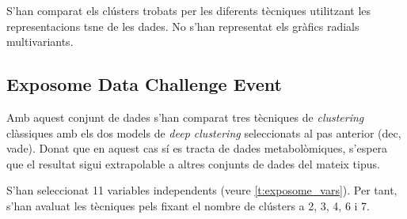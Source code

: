\documentclass[CAT,BIB]{TFUOC}%
\begin{document}
                S'han comparat els clústers trobats per les diferents tècniques
                utilitzant les representacions \gls{tsne} de les dades.
                No s'han representat els gràfics radials multivariants.


        \subsection{Exposome Data Challenge Event}
        \label{s:exposome}

            Amb aquest conjunt de dades s'han comparat
            tres tècniques de \textit{clustering} clàssiques
            amb els dos models de \textit{deep clustering}
            seleccionats al pas anterior
            (\gls{dec}, \gls{vade}).
            Donat que en aquest cas sí es tracta de dades metabolòmiques,
            s'espera que el resultat sigui extrapolable
            a altres conjunts de dades del mateix tipus.

            S'han seleccionat 11 variables independents
            (veure \cref{t:exposome_vars}).
            Per tant, s'han avaluat les tècniques
            pels fixant el nombre de clústers a 2, 3, 4, 6 i 7.
\end{document}
